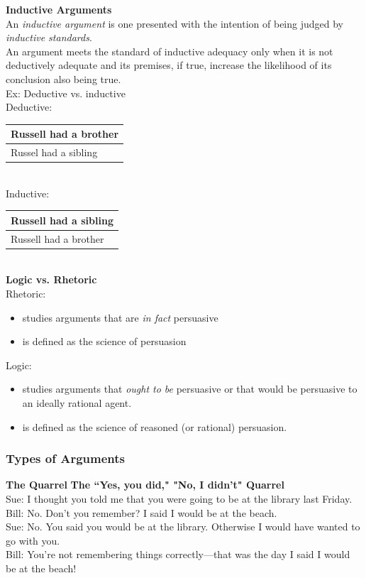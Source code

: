 \documentclass[11pt, fleqn]{article}
\begin{document}
\textbf{Inductive Arguments}\\
An \textit{inductive argument} is one presented with the intention of being judged by \textit{inductive standards}.\\
An argument meets the standard of inductive adequacy only when it is not deductively adequate and its premises, if true, increase the likelihood of its conclusion also being true.\\
Ex: Deductive vs. inductive\\
Deductive:\\
\begin{tabular}{p{16cm}}
Russell had a brother\\
\hline
Russel had a sibling
\end{tabular}\\

Inductive:\\
\begin{tabular}{p{16cm}}
Russell had a sibling\\
\hline
Russell had a brother
\end{tabular}\\

\textbf{Logic vs. Rhetoric}\\
Rhetoric:
\begin{itemize}
    \item studies arguments that are \textit{in fact} persuasive
    \item is defined as the science of persuasion
\end{itemize}
Logic:
\begin{itemize}
    \item studies arguments that \textit{ought to be} persuasive or that would be persuasive to an ideally rational agent.
    \item is defined as the science of reasoned (or rational) persuasion.
\end{itemize}

\subsubsection{Types of Arguments}
\textbf{The Quarrel}
\textbf{The ``Yes, you did," "No, I didn't" Quarrel}\\
Sue: I thought you told me that you were going to be at the library last Friday.\\
Bill: No. Don't you remember? I said I would be at the beach.\\
Sue: No. You said you would be at the library. Otherwise I would have wanted to go with you.\\
Bill: You're not remembering things correctly—that was the day I said I would be at the beach!\\
\end{document}
